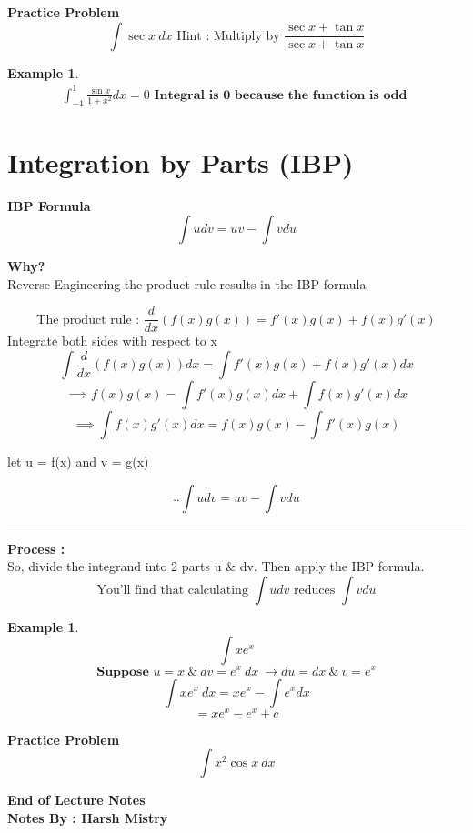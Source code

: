 \documentclass{article}
\newtheorem{ex}[theorem]{Example}
\newenvironment{proof}{{\bf Proof:}}{\hfill\rule{2mm}{2mm}}
\begin{document}
\textbf{Practice Problem}
\[ \int \sec x \ dx   \text{ Hint : Multiply by } \frac{\sec x + \tan x}{\sec x + \tan x} \]

\begin{ex}
\begin{equation}
\begin{aligned}
\int_{-1}^{1} \frac{\sin x}{1 + x^2} dx   =  0  \textbf{ Integral is 0 because the function is odd }
\end{aligned}
\end{equation}
\end{ex}





\section{Integration by Parts (IBP)}
\textbf{IBP Formula}
\[\int udv = uv - \int v du \]

\textbf{Why?} \\
Reverse Engineering the product rule results in the IBP formula

\begin{proof}
\[ \text{The product rule : } \frac{d}{dx} (f(x)g(x))  = f \prime (x) g(x) + f(x) g \prime (x) \]
Integrate both sides with respect to x 
$$\int \frac{d}{dx} (f(x)g(x)) dx  = \int f \prime (x) g(x) + f(x) g \prime (x) dx $$
$$\implies  f(x)g(x) = \int f \prime (x) g(x)  dx + \int f(x) g \prime (x) dx$$
$$\implies  \int f(x) g \prime (x) dx = f(x)g(x) - \int f \prime (x) g(x)$$
\begin{center}
let u = f(x) and v = g(x) 
\end{center}
$$\therefore \int udv = uv - \int vdu $$
\end{proof}

\textbf{Process : }\\
So, divide the integrand into 2 parts u \& dv. Then apply the IBP formula.  
\[\text{You'll find that calculating } \int udv \text{ reduces } \int vdu\]

\begin{ex}

\[\int xe^x \]
\[\textbf{Suppose } u = x  \ \&  \ dv = e^x \ dx \ \rightarrow du = dx \ \& \ v = e^x \]
\[\int xe^x \ dx  = xe^x  - \int e^x dx \]
\[= xe^x - e^x + c \]

\end{ex}
\textbf{Practice Problem}
$$\int x^2 \cos x \ dx $$


\begin{center}
\textbf{End of Lecture Notes} \\
\textbf{Notes By : Harsh Mistry}
\end{center}
\end{document}
